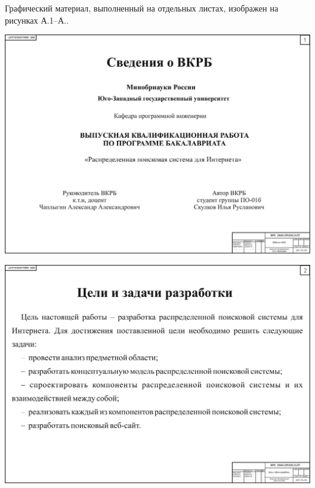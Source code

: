 
Графический материал, выполненный на отдельных листах,
изображен на рисунках А.1--А..
\setcounter{числоПлакатов}{0}

\renewcommand{\thefigure}{А.\arabic{figure}} %

\begin{landscape}

\begin{плакат}
    \includegraphics[width=0.82\linewidth]{posters/p1im.png}
    \label{p1im:image}      
\end{плакат}

\begin{плакат}
    \includegraphics[width=0.82\linewidth]{posters/p2im.png}
    \label{p2im:image}      
\end{плакат}


\end{landscape}

